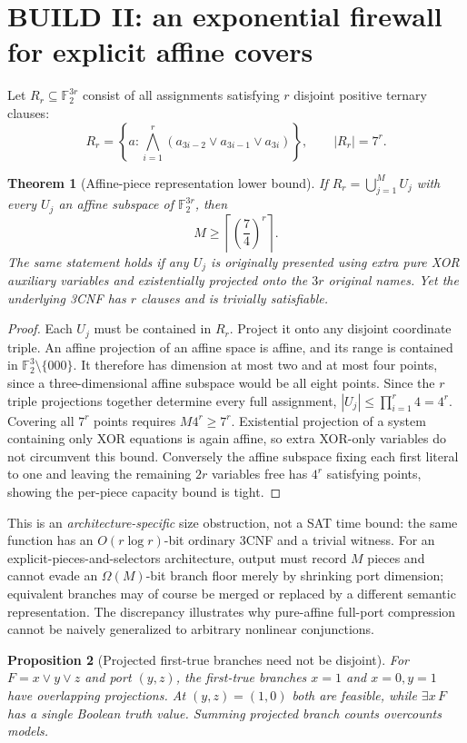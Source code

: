 \documentclass[11pt]{article}
\newtheorem{theorem}{Theorem}
\newtheorem{proposition}[theorem]{Proposition}
\begin{document}
\section{BUILD II: an exponential firewall for explicit affine covers}
Let $R_r\subseteq\mathbb F_2^{3r}$ consist of all assignments satisfying $r$ disjoint positive ternary clauses:
\[
 R_r=\left\{a:\bigwedge_{i=1}^r(a_{3i-2}\vee a_{3i-1}\vee a_{3i})\right\},\qquad |R_r|=7^r.
\]
\begin{theorem}[Affine-piece representation lower bound]
If $R_r=\bigcup_{j=1}^{M}U_j$ with every $U_j$ an affine subspace of $\mathbb F_2^{3r}$, then
\[
 \boxed{M\ge\left\lceil\left(\frac74\right)^r\right\rceil.}
\]
The same statement holds if any $U_j$ is originally presented using extra \emph{pure XOR} auxiliary variables and existentially projected onto the $3r$ original names. Yet the underlying 3CNF has $r$ clauses and is trivially satisfiable.
\end{theorem}
\begin{proof}
Each $U_j$ must be contained in $R_r$. Project it onto any disjoint coordinate triple. An affine projection of an affine space is affine, and its range is contained in $\mathbb F_2^3\setminus\{000\}$. It therefore has dimension at most two and at most four points, since a three-dimensional affine subspace would be all eight points. Since the $r$ triple projections together determine every full assignment, $|U_j|\le\prod_{i=1}^r4=4^r$. Covering all $7^r$ points requires $M4^r\ge7^r$. Existential projection of a system containing only XOR equations is again affine, so extra XOR-only variables do not circumvent this bound. Conversely the affine subspace fixing each first literal to one and leaving the remaining $2r$ variables free has $4^r$ satisfying points, showing the per-piece capacity bound is tight.
\end{proof}

This is an \emph{architecture-specific} size obstruction, not a SAT time bound: the same function has an $O(r\log r)$-bit ordinary 3CNF and a trivial witness. For an explicit-pieces-and-selectors architecture, output must record $M$ pieces and cannot evade an $\Omega(M)$-bit branch floor merely by shrinking port dimension; equivalent branches may of course be merged or replaced by a different semantic representation. The discrepancy illustrates why pure-affine full-port compression cannot be naively generalized to arbitrary nonlinear conjunctions.

\begin{proposition}[Projected first-true branches need not be disjoint]
For $F=x\vee y\vee z$ and port $(y,z)$, the first-true branches $x=1$ and $x=0,y=1$ have overlapping projections. At $(y,z)=(1,0)$ both are feasible, while $\exists x\,F$ has a single Boolean truth value. Summing projected branch counts overcounts models.
\end{proposition}
\end{document}
